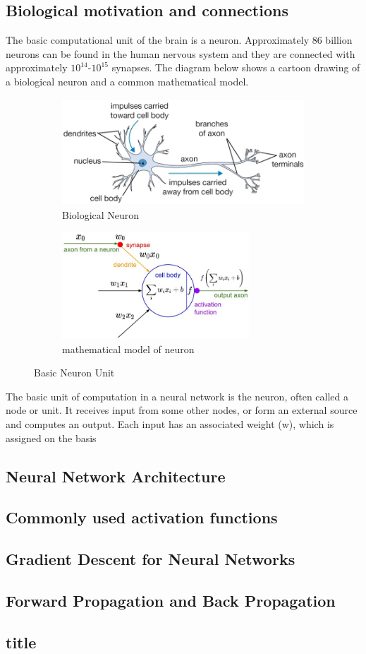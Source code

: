 \subsection{Biological motivation and connections}
The basic computational unit of the brain is a neuron. Approximately 86 billion neurons can be found in the human nervous system and they are connected with approximately $10^14$-$10^15$ synapses. The diagram below shows a cartoon drawing of a biological neuron and a common mathematical model.
\begin{figure}[h]
	
	\begin{subfigure}{0.5\textwidth}
		\includegraphics[width=0.9\linewidth, height=4cm]{Figures/Section3_NeuroStructure.png} 
		\captionsetup{justification=centering}
		\caption{Biological Neuron}
		\label{fig:Bio neuron}
	\end{subfigure}
	\begin{subfigure}{0.5\textwidth}
			\includegraphics[width=0.9\linewidth, height=4cm]{Figures/Section3_NeuroMathe.jpeg}
			\captionsetup{justification=centering}
			\caption{mathematical model of neuron}
			\label{fig:mathe neuron}
	\end{subfigure}
\captionsetup{justification=centering}
\caption{Basic Neuron Unit}
\label{fig:unit of a neuron}
\end{figure}
The basic unit of computation in a neural network is the neuron, often called a node or unit. It receives input from some other nodes, or form an external source and computes an output. Each input has an associated weight (w), which is assigned on the basis
\subsection{Neural Network Architecture}
\subsection{Commonly used activation functions}
\subsection{Gradient Descent for Neural Networks}
\subsection{Forward Propagation and Back Propagation}
\subsection{title}
